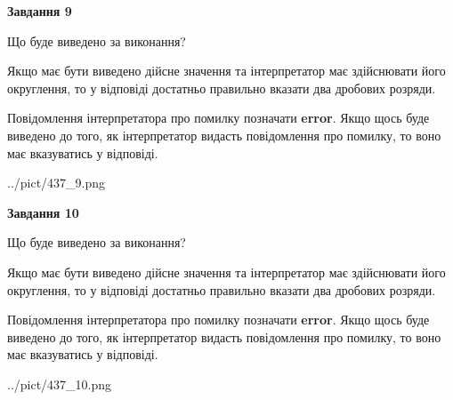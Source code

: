 \documentclass[12pt, ukrainian]{article}
\begin{document}
{\begin {Large}
{\begin {center}\textbf{Завдання 9}\end {center}}\par
Що буде виведено за виконання? \par

Якщо має бути виведено дійсне значення та інтерпретатор має здійснювати його округлення, 
то у відповіді достатньо правильно вказати два дробових розряди.

Повідомлення інтерпретатора про помилку позначати \textbf{error}.
Якщо щось буде виведено до того, як інтерпретатор видасть повідомлення про помилку, 
то воно має вказуватись у відповіді. \par

\begin{center}
	{../pict/437_9.png}
\end{center}
\newpage

{\begin {center}\textbf{Завдання 10}\end {center}}\par
Що буде виведено за виконання? \par

Якщо має бути виведено дійсне значення та інтерпретатор має здійснювати його округлення, 
то у відповіді достатньо правильно вказати два дробових розряди.

Повідомлення інтерпретатора про помилку позначати \textbf{error}.
Якщо щось буде виведено до того, як інтерпретатор видасть повідомлення про помилку, 
то воно має вказуватись у відповіді. \par

\begin{center}
	{../pict/437_10.png}
\end{center}
\newpage

\end {Large}}
\end{document}
